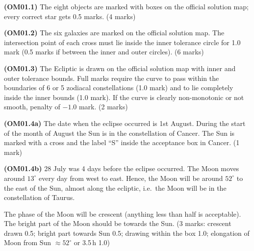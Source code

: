\textbf{(OM01.1)} The eight objects are marked with boxes on the official
solution map; every correct star gets 0.5 marks. \hfill(4 marks)


\textbf{(OM01.2)} The six galaxies are marked on the official solution map.
The intersection point of each cross must lie inside the inner tolerance
circle for 1.0 mark (0.5 marks if between the inner and outer circles).
\hfill(6 marks)


\textbf{(OM01.3)} The Ecliptic is drawn on the official solution map with
inner and outer tolerance bounds. Full marks require the curve to pass
within the boundaries of 6 or 5 zodiacal constellations (1.0 mark) and to
lie completely inside the inner bounds (1.0 mark). If the curve is clearly
non-monotonic or not smooth, penalty of $-1.0$ mark. \hfill(2 marks)


\textbf{(OM01.4a)} The date when the eclipse occurred is 1st August. During
the start of the month of August the Sun is in the constellation of Cancer.
The Sun is marked with a cross and the label ``S'' inside the acceptance box
in Cancer. \hfill(1 mark)

\textbf{(OM01.4b)} 28 July was 4 days before the eclipse occurred. The Moon
moves around $13^\circ$ every day from west to east. Hence, the Moon will be
around $52^\circ$ to the east of the Sun, almost along the ecliptic, i.e.\
the Moon will be in the constellation of Taurus.

The phase of the Moon will be crescent (anything less than half is
acceptable). The bright part of the Moon should be towards the Sun.
\hfill(3 marks: crescent drawn 0.5; bright part towards Sun 0.5; drawing
within the box 1.0; elongation of Moon from Sun $\approx 52^\circ$ or
3.5\,h 1.0)

